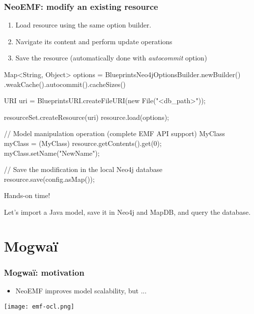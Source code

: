 \begin{frame}[fragile]\frametitle{NeoEMF: modify an existing resource}
	\begin{enumerate}
	\item Load resource using the same option builder.
	\item Navigate its content and perform update operations
	\item Save the resource (automatically done with \emph{autocommit} option)
	\end{enumerate}
	
  \begin{java}
Map<String, Object> options = BlueprintsNeo4jOptionsBuilder.newBuilder()
		.weakCache().autocommit().cacheSizes()

URI uri = BlueprintsURI.createFileURI(new File("<db_path>"));

resourceSet.createResource(uri)
resource.load(options);

// Model manipulation operation (complete EMF API support)
MyClass myClass = (MyClass) resource.getContents().get(0);
myClass.setName("NewName");

// Save the modification in the local Neo4j database
resource.save(config.asMap());
  \end{java}
\end{frame}

\begin{frame}[standout]
  Hands-on time!

  Let's import a Java model, save it in Neo4j and MapDB, and query the database.
\end{frame}

\section{Mogwa\"i}

\begin{frame}[c]\frametitle{Mogwa\"i: motivation}
	\begin{itemize}
		\item NeoEMF improves model scalability, but ...
	\end{itemize}
  \begin{center}
    \texttt{[image: emf-ocl.png]}
  \end{center}
\end{frame}

